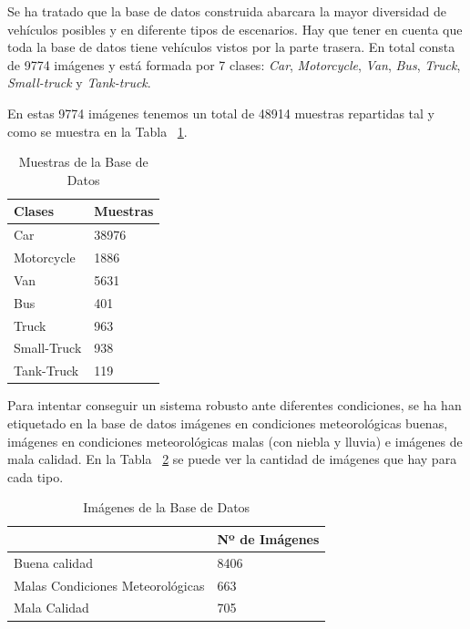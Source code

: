 Se ha tratado que la base de datos construida abarcara la mayor diversidad de vehículos posibles y en diferente tipos de escenarios. Hay que tener en cuenta que toda la base de datos tiene vehículos vistos por la parte trasera. En total consta de 9774 imágenes y está formada por 7 clases: \textit{Car}, \textit{Motorcycle}, \textit{Van}, \textit{Bus}, \textit{Truck}, \textit{Small-truck} y \textit{Tank-truck}.


En estas 9774 imágenes tenemos un total de 48914 muestras repartidas tal y como se muestra en la Tabla ~\ref{tabla_muestras}.

\begin{table}[htbp] 
\begin{center}
\begin{tabular}{|l|l|}
\hline
Clases & Muestras \\
\hline \hline
Car & 38976 \\ \hline
Motorcycle & 1886 \\ \hline
Van & 5631 \\ \hline
Bus & 401 \\ \hline
Truck & 963 \\ \hline
Small-Truck & 938 \\ \hline
Tank-Truck & 119 \\ \hline
\end{tabular}
\caption{Muestras de la Base de Datos}
\label{tabla_muestras}
\end{center}
\end{table}

Para intentar conseguir un sistema robusto ante diferentes condiciones, se ha han etiquetado en la base de datos imágenes en condiciones meteorológicas buenas, imágenes en condiciones meteorológicas malas (con niebla y lluvia) e imágenes de mala calidad. En la Tabla ~\ref{tabla_img_base_datos} se puede ver la cantidad de imágenes que hay para cada tipo.
\begin{table}[htb]
\begin{center}
\begin{tabular}{|l|l|}
\hline
\cline{2-2}& Nº de Imágenes\\
\hline \hline
Buena calidad & 8406 \\ \hline
Malas Condiciones Meteorológicas & 663\\ \hline
Mala Calidad & 705\\ \hline
\end{tabular}
\caption{Imágenes de la Base de Datos}
\label{tabla_img_base_datos}
\end{center}
\end{table}

